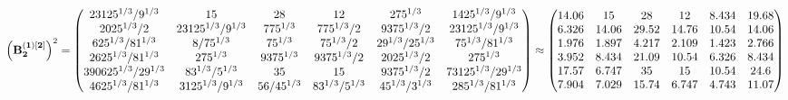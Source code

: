 \documentclass[10pt,a4paper]{article}
\begin{document}
	\[
		\left(\bold{B_2^{(1)[2]}}\right)^{2} = 
		\begin{pmatrix}
			{{2}{3125^ {1 / 3}}} / {{9^ {1 / 3}}} & {{15}}{} & {{28}}{} & {{12}}{} & {{2}{75^ {1 / 3}}}{} & {{14}{25^ {1 / 3}}} / {{9^ {1 / 3}}} \\
			{{2025^ {1 / 3}}} / {{2}} & {{2}{3125^ {1 / 3}}} / {{9^ {1 / 3}}} & {{7}{75^ {1 / 3}}}{} & {{7}{75^ {1 / 3}}} / {{2}} & {{9375^ {1 / 3}}} / {{2}} & {{2}{3125^ {1 / 3}}} / {{9^ {1 / 3}}} \\
			{{625^ {1 / 3}}} / {{81^ {1 / 3}}} & {{8}} / {{75^ {1 / 3}}} & {{75^ {1 / 3}}}{} & {{75^ {1 / 3}}} / {{2}} & {{2}{9^ {1 / 3}}} / {{25^ {1 / 3}}} & {{7}{5^ {1 / 3}}} / {{81^ {1 / 3}}} \\
			{{2}{625^ {1 / 3}}} / {{81^ {1 / 3}}} & {{2}{75^ {1 / 3}}}{} & {{9375^ {1 / 3}}}{} & {{9375^ {1 / 3}}} / {{2}} & {{2025^ {1 / 3}}} / {{2}} & {{2}{75^ {1 / 3}}}{} \\
			{{390625^ {1 / 3}}} / {{2}{9^ {1 / 3}}} & {{8}{3^ {1 / 3}}} / {{5^ {1 / 3}}} & {{35}}{} & {{15}}{} & {{9375^ {1 / 3}}} / {{2}} & {{7}{3125^ {1 / 3}}} / {{2}{9^ {1 / 3}}} \\
			{{4}{625^ {1 / 3}}} / {{81^ {1 / 3}}} & {{3125^ {1 / 3}}} / {{9^ {1 / 3}}} & {{56}} / {{45^ {1 / 3}}} & {{8}{3^ {1 / 3}}} / {{5^ {1 / 3}}} & {{4}{5^ {1 / 3}}} / {{3^ {1 / 3}}} & {{28}{5^ {1 / 3}}} / {{81^ {1 / 3}}} \\
		\end{pmatrix}
		\approx
		\begin{pmatrix}
			14.06    & 15       & 28       & 12       & 8.434    & 19.68    \\
			6.326    & 14.06    & 29.52    & 14.76    & 10.54    & 14.06    \\
			1.976    & 1.897    & 4.217    & 2.109    & 1.423    & 2.766    \\
			3.952    & 8.434    & 21.09    & 10.54    & 6.326    & 8.434    \\
			17.57    & 6.747    & 35       & 15       & 10.54    & 24.6     \\
			7.904    & 7.029    & 15.74    & 6.747    & 4.743    & 11.07    \\
		\end{pmatrix}
	\]
\end{document}
